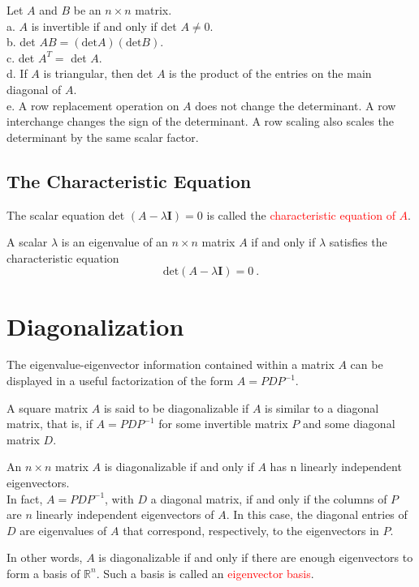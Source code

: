 \documentclass[12pt,a4paper]{article}
\begin{document}
\begin{tcolorbox}[colback=green!5,colframe=green!40!black,title= Properties of Determinants]
Let $A$ and $B$ be an $n\times n$ matrix. \\
a. $A$ is invertible if and only if det $A \neq 0$. \\
b. det $A B = (\text{det} A)(\text{det} B)$. \\
c. det $A^T =$ det $A$. \\
d. If $A$ is triangular, then det $A$ is the product of the entries on the main diagonal of $A$. \\
e. A row replacement operation on $A$ does not change the determinant. A row interchange changes the sign of the determinant. A row scaling also scales the determinant by the same scalar factor. 
\end{tcolorbox}

\subsection{The Characteristic Equation}
The scalar equation det $(A - \lambda \boldsymbol{I}) = 0$ is called the \textcolor{red}{characteristic equation of $A$}.

A scalar $\lambda$ is an eigenvalue of an $n\times n$ matrix $A$ if and only if $\lambda$ satisfies the characteristic equation
\begin{equation*}
\text{det} (A - \lambda \boldsymbol{I}) = 0 ~.
\end{equation*}





\section{Diagonalization}
The eigenvalue-eigenvector information contained within a matrix $A$ can be displayed in a useful factorization of the form $A = PDP^{-1}$. 

A square matrix $A$ is said to be diagonalizable if $A$ is similar to a diagonal matrix, that is, if $A = PDP^{-1}$ for some invertible matrix $P$ and some diagonal matrix $D$.

\begin{tcolorbox}[colback=green!5,colframe=green!40!black,title= The Diagonalization Theorem]
An $n\times n$ matrix $A$ is diagonalizable if and only if $A$ has n linearly independent eigenvectors. \\
In fact, $A = PDP^{-1}$, with $D$ a diagonal matrix, if and only if the columns of $P$ are $n$ linearly independent eigenvectors of $A$. In this case, the diagonal entries of $D$ are eigenvalues of $A$ that correspond, respectively, to the eigenvectors in $P$.
\end{tcolorbox}
In other words, $A$ is diagonalizable if and only if there are enough eigenvectors to form a basis of $\mathbb R^n$. Such a basis is called an \textcolor{red}{eigenvector basis}.
\end{document}
